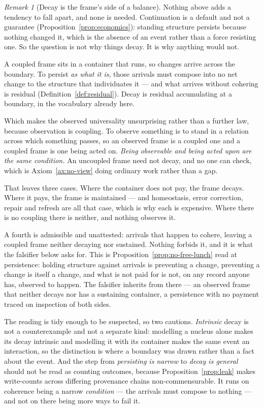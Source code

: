 \documentclass[11pt,a4paper]{article}
\theoremstyle{remark}\newtheorem{remark}[definition]{Remark}
\begin{document}
\begin{remark}[Decay is the frame's side of a balance]\label{rem:decay}
Nothing above adds a tendency to fall apart, and none is needed. Continuation is a default and not a
guarantee (Proposition~\ref{prop:economics}): standing structure persists because nothing changed it,
which is the absence of an event rather than a force resisting one. So the question is not why things
decay. It is why anything would not.

A coupled frame sits in a container that runs, so changes arrive across the boundary. To persist
\emph{as what it is}, those arrivals must compose into no net change to the structure that individuates
it --- and what arrives without cohering is residual (Definition~\ref{def:residual}). Decay is residual
accumulating at a boundary, in the vocabulary already here.

Which makes the observed universality unsurprising rather than a further law, because observation is
coupling. To observe something is to stand in a relation across which something passes, so an observed
frame is a coupled one and a coupled frame is one being acted on. \emph{Being observable and being
acted upon are the same condition.} An uncoupled frame need not decay, and no one can check, which is
Axiom~\ref{ax:no-view} doing ordinary work rather than a gap.

That leaves three cases. Where the container does not pay, the frame decays. Where it
pays, the frame is maintained --- and homeostasis, error correction, repair and refresh are all that
case, which is why each is expensive. Where there is no coupling there is neither, and nothing observes
it.

A fourth is admissible and unattested: arrivals that happen to cohere, leaving a coupled frame neither
decaying nor sustained. Nothing forbids it, and it is what the falsifier below asks for. This is
Proposition~\ref{prop:no-free-lunch} read at persistence: holding structure against
arrivals is preventing a change, preventing a change is itself a change, and what is not paid for is not, on any record anyone has, observed to
happen. The falsifier inherits from there --- an observed frame that neither decays nor has a
sustaining container, a persistence with no payment traced on inspection of both sides.

The reading is tidy enough to be suspected, so two cautions. \emph{Intrinsic} decay is not a
counterexample and not a separate kind: modelling a nucleus alone makes its decay intrinsic and
modelling it with its container makes the same event an interaction, so the distinction is where a
boundary was drawn rather than a fact about the event. And the step from \emph{persisting is narrow} to
\emph{decay is general} should not be read as counting outcomes, because
Proposition~\ref{prop:leak} makes write-counts across differing provenance chains non-commensurable. It
runs on coherence being a narrow \emph{condition} --- the arrivals must compose to nothing --- and not
on there being more ways to fail it.
\end{remark}
\end{document}
